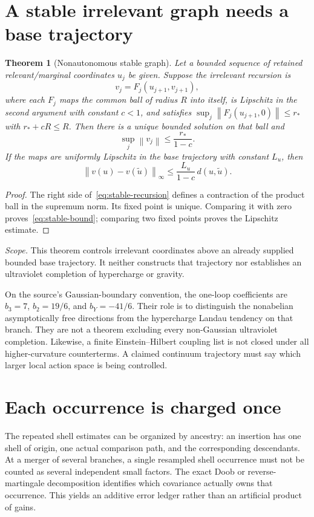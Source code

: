 \documentclass[11pt,a4paper,oneside]{book}
\theoremstyle{plain}
\newtheorem{theorem}{Theorem}[chapter]
\theoremstyle{definition}
\theoremstyle{remark}
\newcommand{\norm}[1]{\left\lVert#1\right\rVert}
\newcommand{\src}[2]{\cite{#1}}
\newcommand{\scope}[1]{\par\smallskip\noindent\textit{Scope.} #1\par\smallskip}
\begin{document}
\section{A stable irrelevant graph needs a base trajectory}
\begin{theorem}[Nonautonomous stable graph]
\label{thm:stable-graph}
Let a bounded sequence of retained relevant/marginal coordinates $u_j$ be given. Suppose the irrelevant recursion is
\begin{equation}
 v_j=F_j(u_{j+1},v_{j+1}),
 \label{eq:stable-recursion}
\end{equation}
where each $F_j$ maps the common ball of radius $R$ into itself, is Lipschitz in the second argument with constant $c<1$, and satisfies $\sup_j\norm{F_j(u_{j+1},0)}\le r_*$ with $r_*+cR\le R$. Then there is a unique bounded solution on that ball and
\begin{equation}
 \sup_j\norm{v_j}\le\frac{r_*}{1-c}.
 \label{eq:stable-bound}
\end{equation}
If the maps are uniformly Lipschitz in the base trajectory with constant $L_u$, then
\begin{equation}
 \norm{v(u)-v(\widetilde u)}_\infty
 \le\frac{L_u}{1-c}\,d(u,\widetilde u).
\end{equation}
\end{theorem}
\begin{proof}
The right side of~\eqref{eq:stable-recursion} defines a contraction of the product ball in the supremum norm. Its fixed point is unique. Comparing it with zero proves~\eqref{eq:stable-bound}; comparing two fixed points proves the Lipschitz estimate.
\end{proof}
\src{R5}{thm:v5v2-Lipschitz}
\scope{This theorem controls irrelevant coordinates above an already supplied bounded base trajectory. It neither constructs that trajectory nor establishes an ultraviolet completion of hypercharge or gravity.}

On the source's Gaussian-boundary convention, the one-loop coefficients are $b_3=7$, $b_2=19/6$, and $b_Y=-41/6$. Their role is to distinguish the nonabelian asymptotically free directions from the hypercharge Landau tendency on that branch. They are not a theorem excluding every non-Gaussian ultraviolet completion. Likewise, a finite Einstein--Hilbert coupling list is not closed under all higher-curvature counterterms. A claimed continuum trajectory must say which larger local action space is being controlled. \cite{R3,R4,R5}

\section{Each occurrence is charged once}
The repeated shell estimates can be organized by ancestry: an insertion has one shell of origin, one actual comparison path, and the corresponding descendants. At a merger of several branches, a single resampled shell occurrence must not be counted as several independent small factors. The exact Doob or reverse-martingale decomposition identifies which covariance actually owns that occurrence. This yields an additive error ledger rather than an artificial product of gains. \cite{R2,R4,R5}
\end{document}
